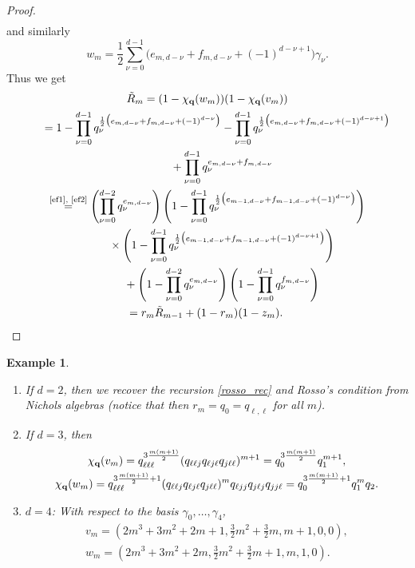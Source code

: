 \documentclass[pdftex]{sigma}
\numberwithin{equation}{section}
\newtheorem{Example}[Theorem]{Example}
\newcommand{\qq }{{\bf q}}
\newcommand{\dn }{d}
\newcommand{\qR }{\tilde R}
\newcommand{\bich }{\chi}
\begin{document}
\begin{proof}
\begin{align*}
\end{align*}
and similarly
\[ w_m = \frac{1}{2}\sum_{\nu=0}^{d-1}\big(e_{m,\dn-\nu}+f_{m,\dn-\nu}+(-1)^{\dn-\nu+1}\big)\gamma_\nu. \]
Thus we get
\begin{gather*}
\qR_m = (1-\bich_\qq(w_m))(1-\bich_\qq(v_m)) \\
\hphantom{\qR_m }{}= 1
-\prod_{\nu=0}^{\dn-1} q_\nu^{\frac{1}{2}\big(e_{m,\dn-\nu}+f_{m,\dn-\nu}+(-1)^{\dn-\nu}\big)}
-\prod_{\nu=0}^{\dn-1} q_\nu^{\frac{1}{2}\big(e_{m,\dn-\nu}+f_{m,\dn-\nu}+(-1)^{\dn-\nu+1}\big)} \\
\hphantom{\qR_m=}{}+\prod_{\nu=0}^{\dn-1} q_\nu^{e_{m,\dn-\nu}+f_{m,\dn-\nu}} \\
\stackrel{\text{\eqref{ef1}, \eqref{ef2}}}{=}
 \left( \prod_{\nu=0}^{d-2} q_\nu^{e_{m,\dn-\nu}} \right)
\left( 1-\prod_{\nu=0}^{\dn-1} q_\nu^{\frac{1}{2}\big(e_{m-1,\dn-\nu}+f_{m-1,\dn-\nu}+(-1)^{\dn-\nu}\big)} \right)
\\
\hphantom{\qR_m=}{}\times\left( 1-\prod_{\nu=0}^{\dn-1} q_\nu^{\frac{1}{2}\big(e_{m-1,\dn-\nu}+f_{m-1,\dn-\nu}+(-1)^{\dn-\nu+1}\big)} \right)
 \\
\hphantom{\qR_m=}{}+ \left(1-\prod_{\nu=0}^{d-2} q_\nu^{e_{m,\dn-\nu}} \right) \left(1-\prod_{\nu=0}^{d-1} q_\nu^{f_{m,\dn-\nu}} \right) \\
\hphantom{\qR_m}{}=r_m \qR_{m-1}+(1-r_m)(1-z_m).\tag*{\qed}
\end{gather*}\renewcommand{\qed}{}
\end{proof}

\begin{Example}\quad
\begin{enumerate}\itemsep=0pt
\item If $\dn=2$, then we recover the recursion \eqref{rosso_rec} and Rosso's condition from Nichols algebras (notice that then $r_m=q_0=q_{\ell,\ell}$ for all $m$).
\item If $\dn=3$, then
\begin{gather*}
\chi_\qq(v_m) = q_{\ell\ell\ell}^{3\frac{m(m+1)}{2}}(q_{\ell\ell j}q_{\ell j\ell}q_{j \ell\ell})^{m+1}
= q_{0}^{3\frac{m(m+1)}{2}}q_{1}^{m+1}, \\
\chi_\qq(w_m) = q_{\ell\ell\ell}^{3\frac{m(m+1)}{2}+1}(q_{\ell\ell j}q_{\ell j\ell}q_{j \ell\ell})^{m}
q_{\ell j j}q_{j \ell j}q_{j j \ell}
= q_{0}^{3\frac{m(m+1)}{2}+1}q_{1}^{m} q_{2}.
\end{gather*}
\item $d=4$: With respect to the basis $\gamma_0,\dots,\gamma_4$,
\begin{gather*}
v_m = \left( 2m^3+3m^2+2m+1,
\frac{3}{2}m^2+\frac{3}{2}m,
m+1,
0,
0\right), \\
w_m = \left(2 m^3+3 m^2+2m,
\frac{3}{2}m^2+\frac{3}{2}m+1,
m,
1,
0
\right).
\end{gather*}
\end{enumerate}
\end{Example}
\end{document}
